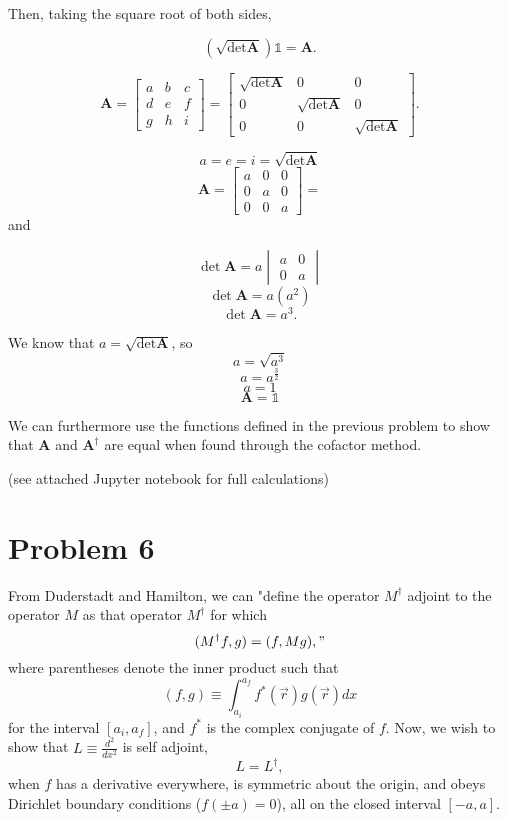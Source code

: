 \documentclass{article}
\newcommand{\pos}{\vec{r}}
\begin{document}
Then, taking the square root of both sides,

$$ \left(\sqrt{\det{\textbf{A}}}\right)\mathbb{1} = \textbf{A} .$$

$$ \textbf{A} = \begin{bmatrix} a & b & c \\
                                d & e & f \\
                                g & h & i \end{bmatrix} =
                \begin{bmatrix} \sqrt{\det{\textbf{A}}} & 0 & 0 \\
                                0 & \sqrt{\det{\textbf{A}}} & 0 \\
                                0 & 0 & \sqrt{\det{\textbf{A}}} \end{bmatrix}. $$
                
$$ a = e = i = \sqrt{\det{\textbf{A}}} $$
$$ \textbf{A} = \begin{bmatrix} a & 0 & 0 \\
                                0 & a & 0 \\
                                0 & 0 & a \end{bmatrix} = $$
and

$$ \det{\textbf{A}} = a \begin{vmatrix} a & 0 \\ 0 & a \end{vmatrix} $$
$$ \det{\textbf{A}} = a (a^2) $$
$$ \det{\textbf{A}} = a^3 .$$

We know that $a = \sqrt{\det{\textbf{A}}}$, so
$$ a = \sqrt{a^3} $$
$$ a = a^{\frac{3}{2}} $$
$$ a = 1 $$
$$\boxed{ \textbf{A} = \mathbb{1} }$$

We can furthermore use the functions defined in the previous problem to show that $\textbf{A}$ and  $\textbf{A}^{\dagger}$ are equal when found through the cofactor method.

(see attached Jupyter notebook for full calculations)




\section*{Problem 6}

From Duderstadt and Hamilton, we can "define the operator $M^{\dagger}$ adjoint to the operator $M$ as that operator $M^{\dagger}$ for which
$$ (M^{\dagger}f,g) = (f,Mg) ,"$$
where parentheses denote the inner product such that
$$ (f,g) \equiv \int_{a_i}^{a_f} f^*(\pos)g(\pos) dx $$
for the interval $[a_i,a_f]$, and $f^*$ is the complex conjugate of $f$.
Now, we wish to show that $L \equiv \frac{d^2}{dx^2}$ is self adjoint,
$$ L = L^{\dagger} ,$$
when $f$ has a derivative everywhere, is symmetric about the origin, and obeys Dirichlet boundary conditions ($f(\pm a) = 0$), all on the closed interval $[-a,a]$.
\end{document}
